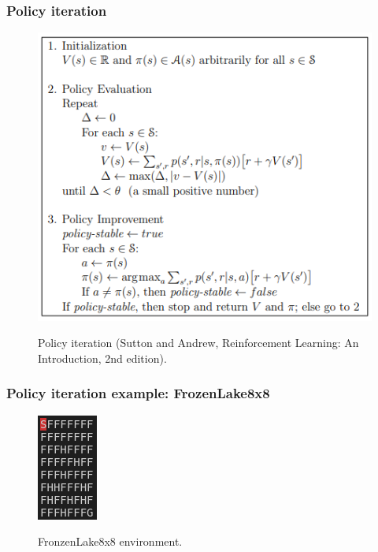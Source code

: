 \documentclass{beamer}
\begin{document}
        \begin{frame}
            \frametitle{Policy iteration}
            \begin{figure}
                \centering
                \includegraphics[width=0.6\linewidth]{figures/policy_iteration.png}
                \label{fig2:policy}
                \caption{Policy iteration (Sutton and Andrew, Reinforcement Learning: An Introduction, 2nd edition).}
            \end{figure}
        \end{frame}

        \begin{frame}
            \frametitle{Policy iteration example: FrozenLake8x8}
            \begin{figure}
                \centering
                \includegraphics[width=0.2\linewidth]{figures/frozenlake8x8}
                \label{fig4:frozenlake8x8}
                \caption{FronzenLake8x8 environment.}
            \end{figure}
        \end{frame}
\end{document}

